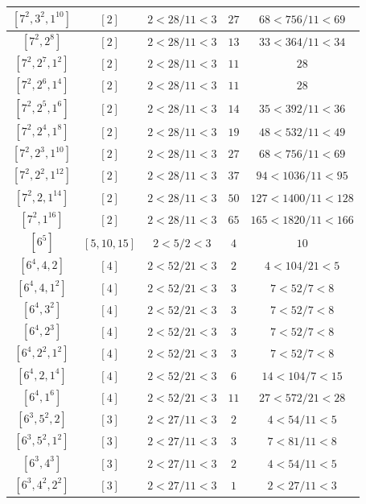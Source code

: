 \documentclass{article}%
\begin{document}
\begin{center}
\begin{longtable}{||c|c|c|c|c||}
$[7^{2}, 3^{2}, 1^{10}]$ & $[2]$ & $2 < 28/11 < 3$ & $27$ & $68 < 756/11 < 69$ \\ \hline 
$[7^{2}, 2^{8}]$ & $[2]$ & $2 < 28/11 < 3$ & $13$ & $33 < 364/11 < 34$ \\ \hline 
$[7^{2}, 2^{7}, 1^{2}]$ & $[2]$ & $2 < 28/11 < 3$ & $11$ & $28$ \\ \hline 
$[7^{2}, 2^{6}, 1^{4}]$ & $[2]$ & $2 < 28/11 < 3$ & $11$ & $28$ \\ \hline 
$[7^{2}, 2^{5}, 1^{6}]$ & $[2]$ & $2 < 28/11 < 3$ & $14$ & $35 < 392/11 < 36$ \\ \hline 
$[7^{2}, 2^{4}, 1^{8}]$ & $[2]$ & $2 < 28/11 < 3$ & $19$ & $48 < 532/11 < 49$ \\ \hline 
$[7^{2}, 2^{3}, 1^{10}]$ & $[2]$ & $2 < 28/11 < 3$ & $27$ & $68 < 756/11 < 69$ \\ \hline 
$[7^{2}, 2^{2}, 1^{12}]$ & $[2]$ & $2 < 28/11 < 3$ & $37$ & $94 < 1036/11 < 95$ \\ \hline 
$[7^{2}, 2, 1^{14}]$ & $[2]$ & $2 < 28/11 < 3$ & $50$ & $127 < 1400/11 < 128$ \\ \hline 
$[7^{2}, 1^{16}]$ & $[2]$ & $2 < 28/11 < 3$ & $65$ & $165 < 1820/11 < 166$ \\ \hline 
$[6^{5}]$ & $[5, 10, 15]$ & $2 < 5/2 < 3$ & $4$ & $10$ \\ \hline 
$[6^{4}, 4, 2]$ & $[4]$ & $2 < 52/21 < 3$ & $2$ & $4 < 104/21 < 5$ \\ \hline 
$[6^{4}, 4, 1^{2}]$ & $[4]$ & $2 < 52/21 < 3$ & $3$ & $7 < 52/7 < 8$ \\ \hline 
$[6^{4}, 3^{2}]$ & $[4]$ & $2 < 52/21 < 3$ & $3$ & $7 < 52/7 < 8$ \\ \hline 
$[6^{4}, 2^{3}]$ & $[4]$ & $2 < 52/21 < 3$ & $3$ & $7 < 52/7 < 8$ \\ \hline 
$[6^{4}, 2^{2}, 1^{2}]$ & $[4]$ & $2 < 52/21 < 3$ & $3$ & $7 < 52/7 < 8$ \\ \hline 
$[6^{4}, 2, 1^{4}]$ & $[4]$ & $2 < 52/21 < 3$ & $6$ & $14 < 104/7 < 15$ \\ \hline 
$[6^{4}, 1^{6}]$ & $[4]$ & $2 < 52/21 < 3$ & $11$ & $27 < 572/21 < 28$ \\ \hline 
$[6^{3}, 5^{2}, 2]$ & $[3]$ & $2 < 27/11 < 3$ & $2$ & $4 < 54/11 < 5$ \\ \hline 
$[6^{3}, 5^{2}, 1^{2}]$ & $[3]$ & $2 < 27/11 < 3$ & $3$ & $7 < 81/11 < 8$ \\ \hline 
$[6^{3}, 4^{3}]$ & $[3]$ & $2 < 27/11 < 3$ & $2$ & $4 < 54/11 < 5$ \\ \hline 
$[6^{3}, 4^{2}, 2^{2}]$ & $[3]$ & $2 < 27/11 < 3$ & $1$ & $2 < 27/11 < 3$ \\ \hline 

\end{longtable}
\end{center}
\end{document}
